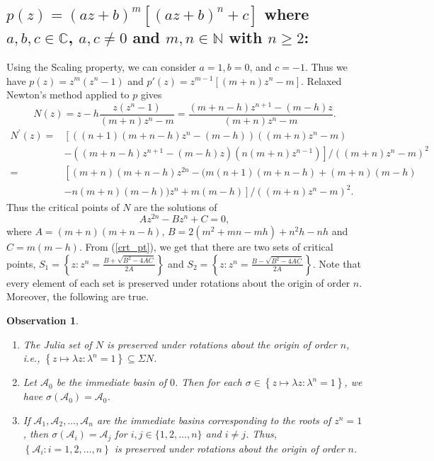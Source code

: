 \documentclass[12pt]{article}
\newtheorem{obs}[thm]{Observation}
\numberwithin{equation}{section}
\begin{document}
\subsection{$p(z)=(a z+b)^{m}\left[(a z+b)^{n}+c\right]$ where $a, b, c \in \mathbb{C}$, $a, c \neq 0$ and $m, n \in \mathbb{N}$ with $n\geq 2$:}
Using the Scaling property, we can consider $a=1, b=0$, and $c=-1$. Thus we have $p(z)=z^{m}\left(z^{n}-1\right)$ and $
p'(z) =z^{m-1}\left[(m+n) z^{n}-m\right]
$.
Relaxed Newton's method applied to $p$ gives
$$N(z)= z-h\frac{ z(z^{n}-1)}{(m+n) z^{n}-m}= \frac{(m+n-h) z^{n+1}-(m-h) z}{(m+n) z^{n}-m}.$$
$$
\begin{aligned}
N^{\prime}(z)=&  {\left[((n+1)(m+n-h) z^{n}-(m-h))((m+n) z^{n}-m)\right.} \\
& \left.-((m+n-h) z^{n+1}-(m-h) z)(n(m+n) z^{n-1})\right] /((m+n) z^{n}-m)^{2} \\
= & {\left[(m+n)(m+n-h) z^{2 n}-(m(n+1)(m+n-h)+(m+n)(m-h)\right.} \\
& \left.-n(m+n)(m-h)) z^{n}+m(m-h)\right] /((m+n) z^{n}-m)^{2}.
\end{aligned}
$$
Thus the critical points of $N$ are the solutions of
\begin{equation}\label{crt_pt}
A z^{2 n}-B z^{n}+C=0,
\end{equation}
where
$A=(m+n)(m+n-h)$, $ B=2\left(m^{2}+m n-m h\right)+n^2h-n h $ and $ C=m(m-h). $ From (\ref{crt_pt}), we get that there are two sets of critical points, $S_{1}=\left\{z: z^{n}=\frac{B + \sqrt{B^{2}-4 A C}}{2A}\right\}$ and $S_{2}=\left\{z: z^{n}=\frac{B - \sqrt{B^{2}-4 A C}}{2A}\right\}$. Note that every element of each set is preserved under rotations about the origin of order $n$. Moreover, the following are true.
\begin{obs}\label{Prop_ReNew}
\begin{enumerate}
\item The Julia set of $N$ is preserved under rotations about the origin of order $n$, i.e., $\left\{z \mapsto \lambda z: \lambda^{n}=1\right\} \subseteq \Sigma N$.
\item Let $\mathcal{A}_{0}$ be the immediate basin of $0$. Then for each $\sigma \in \left\{z \mapsto \lambda z: \lambda^{n}=1\right\}$, we have $\sigma\left(\mathcal{A}_{0}\right)=\mathcal{A}_{0}$.
\item  If $\mathcal{A}_{1}, \mathcal{A}_{2}, \dots, \mathcal{A}_{n}$ are the immediate basins corresponding to the roots of $z^{n}=1$, then $\sigma\left(\mathcal{A}_{i}\right)=\mathcal{A}_{j}$ for $ i, j \in\{1,2, \dots, n\}$ and $ i \neq j$. Thus, $\left\{\mathcal{A}_{i}: i=1,2, \ldots, n\right\}$ is preserved under rotations about the origin of order $n$.
\end{enumerate}
\end{obs}
\end{document}

